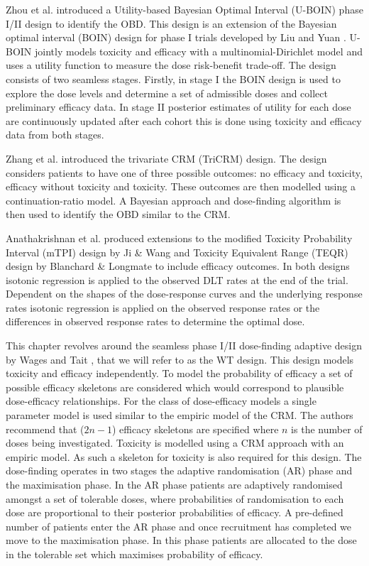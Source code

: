 Zhou et al. \cite{zhouUtilitybasedBayesianOptimal2019} introduced a Utility-based Bayesian Optimal Interval (U-BOIN) phase \RN{1}/\RN{2} design to identify the OBD. This design is an extension of the Bayesian optimal interval (BOIN) design for phase \RN{1} trials developed by Liu and Yuan \cite{liuBAYESIANDATAAUGMENTATION2013}. U-BOIN jointly models toxicity and efficacy with a multinomial-Dirichlet model and uses a utility function to measure the dose risk-benefit trade-off. The design consists of two seamless stages. Firstly, in stage \RN{1} the BOIN design is used to explore the dose levels and determine a set of admissible doses and collect preliminary efficacy data. In stage \RN{2} posterior estimates of utility for each dose are continuously updated after each cohort this is done using toxicity and efficacy data from both stages. 

Zhang et al. \cite{zhangAdaptiveDosefindingDesign2006} introduced the trivariate CRM (TriCRM) design. The design considers patients to have one of three possible outcomes: no efficacy and toxicity, efficacy without toxicity and toxicity. These outcomes are then modelled using a continuation-ratio model. A Bayesian approach and dose-finding algorithm is then used to identify the OBD similar to the CRM.  

Anathakrishnan et al. \cite{ananthakrishnanExtensionsMTPITEQR2018} produced extensions to the modified Toxicity Probability Interval (mTPI) design by Ji \& Wang \cite{jiModifiedToxicityProbability2013} and Toxicity Equivalent Range (TEQR) design by Blanchard \& Longmate \cite{blanchardToxicityEquivalenceRange2011} to include efficacy outcomes. In both designs isotonic regression is applied to the observed DLT rates at the end of the trial. Dependent on the shapes of the dose-response curves and the underlying response rates isotonic regression is applied on the observed response rates or the differences in observed response rates to determine the optimal dose. 

This chapter revolves around the seamless phase \RN{1}/\RN{2} dose-finding adaptive design by Wages and Tait \cite{wagesSeamlessPhaseII2015}, that we will refer to as the WT design.
This design models toxicity and efficacy independently. To model the probability of efficacy a set of possible efficacy skeletons are considered which would correspond to plausible dose-efficacy relationships. For the class of dose-efficacy models a single parameter model is used similar to the empiric model of the CRM. The authors recommend that ($2n - 1$) efficacy skeletons are specified where $n$ is the number of doses being investigated. Toxicity is modelled using a CRM approach with an empiric model. As such a skeleton for toxicity is also required for this design. The dose-finding operates in two stages the adaptive randomisation (AR) phase and the maximisation phase. In the AR phase patients are adaptively randomised amongst a set of tolerable doses, where probabilities of randomisation to each dose are proportional to their posterior probabilities of efficacy. A pre-defined number of patients enter the AR phase and once recruitment has completed we move to the maximisation phase. In this phase patients are allocated to the dose in the tolerable set which maximises probability of efficacy.  

